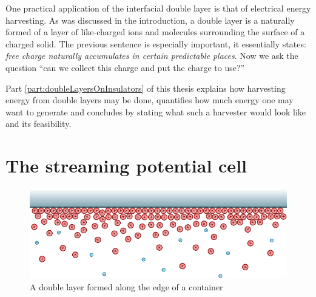 
%
%
%

One practical application of the interfacial double layer is that of electrical energy harvesting. As was discussed in the introduction, a double layer is a naturally formed of a layer of like-charged ions and molecules surrounding the surface of a charged solid. The previous sentence is especially important, it essentially states: \emph{free charge naturally accumulates in certain predictable places}. Now we ask the question ``can we collect this charge and put the charge to use?''

Part \ref{part:doubleLayersOnInsulators} of this thesis explains how harvesting energy from double layers may be done, quantifies how much energy one may want to generate and concludes by stating what such a harvester would look like and its feasibility.



\section{The streaming potential cell}


\begin{figure}[H]
\centering
\includegraphics{content/pt1/01-PowerHarvesting/graphics/doubleLayerOnWall}
\caption{\label{fig:doubleLayerOnWall}A double layer formed along the edge of a container}
\end{figure}


